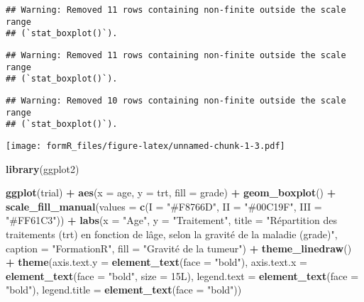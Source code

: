 \documentclass[
]{article}
\newenvironment{Shaded}{\begin{snugshade}}{\end{snugshade}}
\newcommand{\AttributeTok}[1]{\textcolor[rgb]{0.13,0.29,0.53}{#1}}
\newcommand{\DataTypeTok}[1]{\textcolor[rgb]{0.13,0.29,0.53}{#1}}
\newcommand{\DecValTok}[1]{\textcolor[rgb]{0.00,0.00,0.81}{#1}}
\newcommand{\FunctionTok}[1]{\textcolor[rgb]{0.13,0.29,0.53}{\textbf{#1}}}
\newcommand{\NormalTok}[1]{#1}
\newcommand{\SpecialCharTok}[1]{\textcolor[rgb]{0.81,0.36,0.00}{\textbf{#1}}}
\newcommand{\StringTok}[1]{\textcolor[rgb]{0.31,0.60,0.02}{#1}}
\begin{document}
\begin{verbatim}
## Warning: Removed 11 rows containing non-finite outside the scale range
## (`stat_boxplot()`).
\end{verbatim}

\begin{verbatim}
## Warning: Removed 11 rows containing non-finite outside the scale range
## (`stat_boxplot()`).
\end{verbatim}

\begin{verbatim}
## Warning: Removed 10 rows containing non-finite outside the scale range
## (`stat_boxplot()`).
\end{verbatim}

\texttt{[image: formR\_files/figure-latex/unnamed-chunk-1-3.pdf]}

\begin{Shaded}
\begin{Highlighting}[]
\FunctionTok{library}\NormalTok{(ggplot2)}

\FunctionTok{ggplot}\NormalTok{(trial) }\SpecialCharTok{+}
  \FunctionTok{aes}\NormalTok{(}\AttributeTok{x =}\NormalTok{ age, }\AttributeTok{y =}\NormalTok{ trt, }\AttributeTok{fill =}\NormalTok{ grade) }\SpecialCharTok{+}
  \FunctionTok{geom\_boxplot}\NormalTok{() }\SpecialCharTok{+}
  \FunctionTok{scale\_fill\_manual}\NormalTok{(}\AttributeTok{values =} \FunctionTok{c}\NormalTok{(}\AttributeTok{I =} \StringTok{"\#F8766D"}\NormalTok{, }
                               \AttributeTok{II =} \StringTok{"\#00C19F"}\NormalTok{, }\AttributeTok{III =} \StringTok{"\#FF61C3"}\NormalTok{)) }\SpecialCharTok{+}
  \FunctionTok{labs}\NormalTok{(}\AttributeTok{x =} \StringTok{"Age"}\NormalTok{, }\AttributeTok{y =} \StringTok{"Traitement"}\NormalTok{, }\AttributeTok{title =} \StringTok{"Répartition des traitements (trt) en fonction de l\textquotesingle{}âge, selon la gravité de la maladie (grade)"}\NormalTok{, }
       \AttributeTok{caption =} \StringTok{"FormationR"}\NormalTok{, }\AttributeTok{fill =} \StringTok{"Gravité de la tumeur"}\NormalTok{) }\SpecialCharTok{+}
  \FunctionTok{theme\_linedraw}\NormalTok{() }\SpecialCharTok{+}
  \FunctionTok{theme}\NormalTok{(}\AttributeTok{axis.text.y =} \FunctionTok{element\_text}\NormalTok{(}\AttributeTok{face =} \StringTok{"bold"}\NormalTok{), }
        \AttributeTok{axis.text.x =} \FunctionTok{element\_text}\NormalTok{(}\AttributeTok{face =} \StringTok{"bold"}\NormalTok{, }\AttributeTok{size =} \DecValTok{15}\DataTypeTok{L}\NormalTok{), }\AttributeTok{legend.text =} \FunctionTok{element\_text}\NormalTok{(}\AttributeTok{face =} \StringTok{"bold"}\NormalTok{), }
        \AttributeTok{legend.title =} \FunctionTok{element\_text}\NormalTok{(}\AttributeTok{face =} \StringTok{"bold"}\NormalTok{))}
\end{Highlighting}
\end{Shaded}
\end{document}
